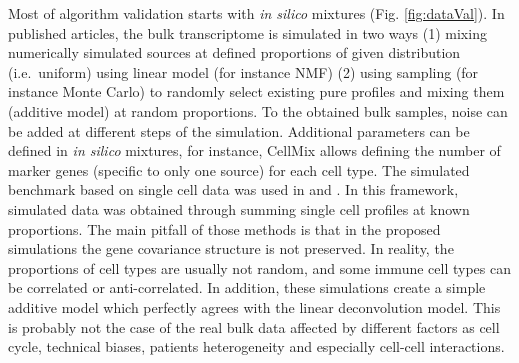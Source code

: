 \documentclass[12pt,]{book}
\theoremstyle{definition}
\theoremstyle{definition}
\theoremstyle{definition}
\theoremstyle{remark}
\begin{document}
Most of algorithm validation starts with \emph{in silico} mixtures (Fig.
\ref{fig:dataVal}). In published articles, the bulk transcriptome is
simulated in two ways (1) mixing numerically simulated sources at
defined proportions of given distribution (i.e.~uniform) using linear
model (for instance NMF) (2) using sampling (for instance Monte Carlo)
to randomly select existing pure profiles and mixing them (additive
model) at random proportions. To the obtained bulk samples, noise can be
added at different steps of the simulation. Additional parameters can be
defined in \emph{in silico} mixtures, for instance, CellMix allows
defining the number of marker genes (specific to only one source) for
each cell type. The simulated benchmark based on single cell data was
used in \citet{Schelker2017} and \citet{Gortler2018}. In this framework,
simulated data was obtained through summing single cell profiles at
known proportions. The main pitfall of those methods is that in the
proposed simulations the gene covariance structure is not preserved. In
reality, the proportions of cell types are usually not random, and some
immune cell types can be correlated or anti-correlated. In addition,
these simulations create a simple additive model which perfectly agrees
with the linear deconvolution model. This is probably not the case of
the real bulk data affected by different factors as cell cycle,
technical biases, patients heterogeneity and especially cell-cell
interactions.
\end{document}
